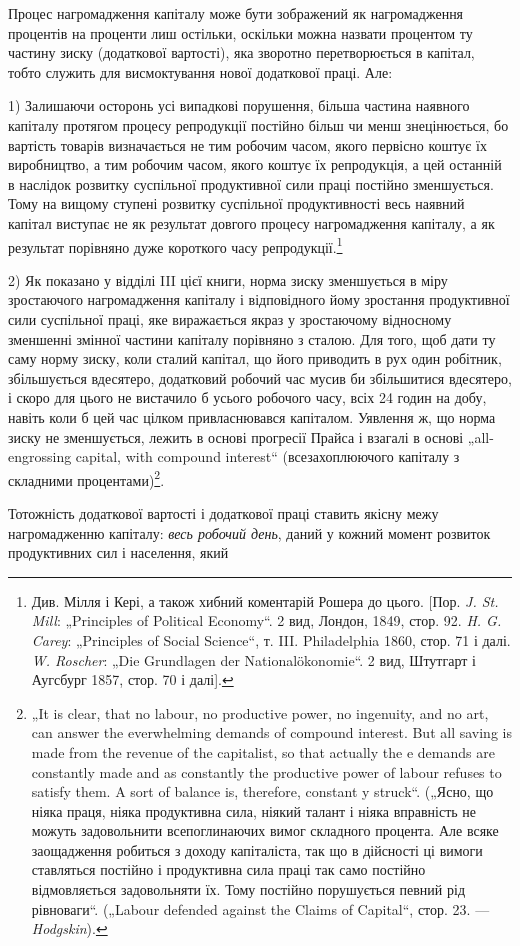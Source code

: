 Процес нагромадження капіталу може бути зображений як
нагромадження процентів на проценти лиш остільки, оскільки
можна назвати процентом ту частину зиску (додаткової вартості),
яка зворотно перетворюється в капітал, тобто служить для висмоктування
нової додаткової праці. Але:

1) Залишаючи осторонь усі випадкові порушення, більша частина
наявного капіталу протягом процесу репродукції постійно
більш чи менш знецінюється, бо вартість товарів визначається
не тим робочим часом, якого первісно коштує їх виробництво,
а тим робочим часом, якого коштує їх репродукція, а цей останній
в наслідок розвитку суспільної продуктивної сили праці постійно
зменшується. Тому на вищому ступені розвитку суспільної
продуктивності весь наявний капітал виступає не як результат
довгого процесу нагромадження капіталу, а як результат
порівняно дуже короткого часу репродукції.\footnote{
Див. Мілля і Кері, а також хибний коментарій Рошера до цього. [Пор.
\emph{J. St. Mill}: „Principles of Political Economy“. 2 вид, Лондон, 1849, стор. 92. \emph{H. G.
Carey}: „Principles of Social Science“, т. III. Philadelphia 1860, стор. 71 і далі.
\emph{W. Roscher}: „Die Grundlagen der Nationalökonomie“. 2 вид, Штутгарт і Аугсбург
1857, стор. 70 і далі].
}

2) Як показано у відділі III цієї книги, норма зиску зменшується
в міру зростаючого нагромадження капіталу і відповідного
йому зростання продуктивної сили суспільної праці, яке
виражається якраз у зростаючому відносному зменшенні змінної
частини капіталу порівняно з сталою. Для того, щоб дати ту
саму норму зиску, коли сталий капітал, що його приводить в рух
один робітник, збільшується вдесятеро, додатковий робочий час
мусив би збільшитися вдесятеро, і скоро для цього не вистачило
б усього робочого часу, всіх 24 годин на добу, навіть
коли б цей час цілком привласнювався капіталом. Уявлення ж, що
норма зиску не зменшується, лежить в основі прогресії Прайса
і взагалі в основі „all-engrossing capital, with compound interest“
(всезахоплюючого капіталу з складними процентами)\footnote{
„It is clear, that no labour, no productive power, no ingenuity, and no art,
can answer the everwhelming demands of compound interest. But all saving is
made from the revenue of the capitalist, so that actually the e demands are constantly
made and as constantly the productive power of labour refuses to satisfy
them. A sort of balance is, therefore, constant y struck“. („Ясно, що ніяка праця,
ніяка продуктивна сила, ніякий талант і ніяка вправність не можуть задовольнити
всепоглинаючих вимог складного процента. Але всяке заощадження робиться з
доходу капіталіста, так що в дійсності ці вимоги ставляться постійно і продуктивна сила праці так
само постійно відмовляється задовольняти їх. Тому
постійно порушується певний рід рівноваги“. („Labour defended against the Claims
of Capital“, стор. 23. — \emph{Hodgskin}).
}.

Тотожність додаткової вартості і додаткової праці ставить
якісну межу нагромадженню капіталу: \emph{весь робочий день}, даний
у кожний момент розвиток продуктивних сил і населення, який
\parbreak{}  %
